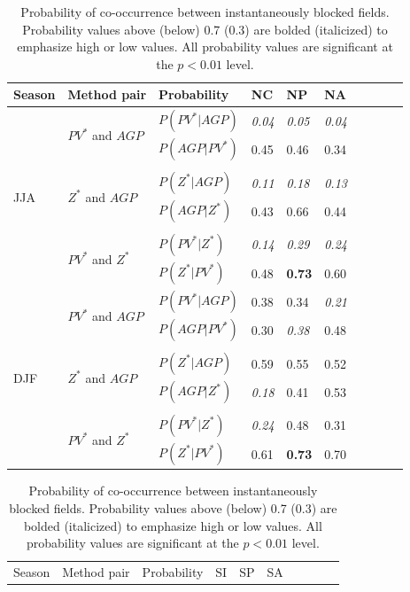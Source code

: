 \documentclass[smallextended]{svjour3}       %
\numberwithin{equation}{section}
\begin{document}
\begin{table}
\centering
\caption{Probability of co-occurrence between instantaneously blocked fields. Probability values above (below) 0.7 (0.3) are bolded (italicized) to emphasize high or low values. All probability values are significant at the $p<0.01$ level. }
\label{probtabcol}
\begin{tabular}{|l|l|l|l|l|l|l|l|l|l|}
\hline
Season & Method pair & Probability & NC    & NP    & NA      \\ \hline
\multirow{8}{*}{JJA} 
   & \multirow{2}{*}{$PV^* $ and $AGP$}&$P(PV^*|AGP)$ & \textit{0.04} & \textit{0.05} & \textit{{0.04}}  \\  
   & & $P(AGP|PV^*)$ & {0.45} & {0.46} & {0.34}  \\ 
   &&&&&\\
   & \multirow{2}{*}{$Z^*$ and $AGP$} &$P(Z^*|AGP)$    & \textit{{0.11}} & \textit{{0.18}} & \textit{{0.13} } \\  
   &&$P(AGP|Z^*)$   & {0.43} & {0.66} & {0.44} \\ 
      &&&&&\\
      & \multirow{2}{*}{$PV^*$ and $Z^*$ } &$P(PV^*|Z^*)$    & \textit{0.14}& \textit{0.29}& \textit{{0.24}} \\ 
   &&$P(Z^*|PV^*)$   & {0.48} & \textbf{{0.73}} & 0.60  \\ 
  
  \hline
  \multirow{8}{*}{DJF} 
   & \multirow{2}{*}{$PV^* $ and $AGP$}&$P(PV^*|AGP)$ & {0.38} & {0.34} &\textit{{0.21}}  \\
   & & $P(AGP|PV^*)$& {{0.30}} &\textit{0.38}& {0.48}\\ 
      &&&&&\\
   & \multirow{2}{*}{$Z^*$ and $AGP$} &$P(Z^*|AGP)$ & {0.59} &0.55& {0.52} \\ 
   &&$P(AGP|Z^*)$   & \textit{{0.18} }& {0.41} & 0.53 \\ 
      &&&&&\\
      & \multirow{2}{*}{$PV^*$ and $Z^*$ } &$P(PV^*|Z^*)$    & \textit{0.24} & {0.48} & {0.31} \\
   &&$P(Z^*|PV^*)$   & {0.61} & \textbf{0.73} & {0.70}  \\   
  \hline
\end{tabular}
\begin{tabular}{|l|l|l|l|l|l|l|l|l|l|}
\hline
  Season & Method pair & Probability & SI    & SP    & SA    \\ 
  

\end{tabular}
\end{table}
\end{document}
